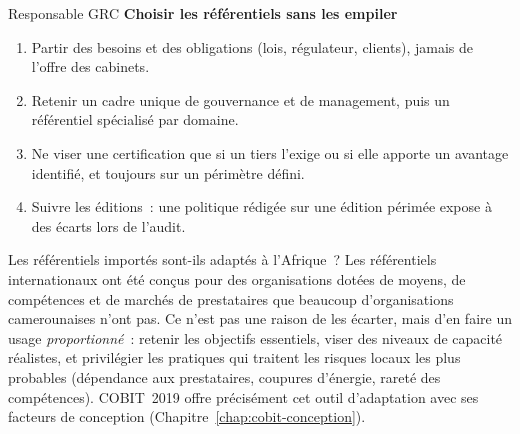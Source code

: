 \begin{boxmetier}{Responsable GRC}
\textbf{Choisir les référentiels sans les empiler}
\begin{enumerate}
    \item Partir des besoins et des obligations (lois, régulateur, clients),
          jamais de l'offre des cabinets.
    \item Retenir un cadre unique de gouvernance et de management, puis un
          référentiel spécialisé par domaine.
    \item Ne viser une certification que si un tiers l'exige ou si elle
          apporte un avantage identifié, et toujours sur un périmètre
          défini.
    \item Suivre les éditions~: une politique rédigée sur une édition
          périmée expose à des écarts lors de l'audit.
\end{enumerate}
\end{boxmetier}

\begin{boiteRemarque}{Les référentiels importés sont-ils adaptés à l'Afrique~?}
Les référentiels internationaux ont été conçus pour des organisations
dotées de moyens, de compétences et de marchés de prestataires que
beaucoup d'organisations camerounaises n'ont pas. Ce n'est pas une raison
de les écarter, mais d'en faire un usage \emph{proportionné}~: retenir les
objectifs essentiels, viser des niveaux de capacité réalistes, et
privilégier les pratiques qui traitent les risques locaux les plus
probables (dépendance aux prestataires, coupures d'énergie, rareté des
compétences). COBIT~2019 offre précisément cet outil d'adaptation avec
ses facteurs de conception (Chapitre~\ref{chap:cobit-conception}).
\end{boiteRemarque}

\separateur

